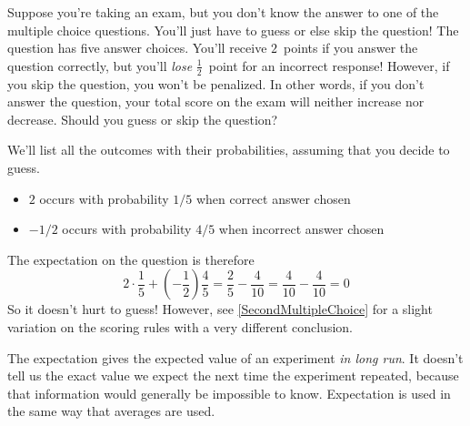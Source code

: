 \documentclass{ximera}
\begin{document}
\begin{example}
Suppose you're taking an exam, but you
don't know the answer to one of the
multiple choice questions. You'll just have to guess or
else skip the question!
The question has five answer choices. You'll receive
$2$~points if you answer the question correctly,
but you'll {\em lose} $\frac{1}{2}$~point for an incorrect response!
However, if you skip the question, you won't be penalized.
In other words, if you don't answer the question, your total
score on the exam will neither increase nor decrease.
Should you guess or skip the question?

We'll list all the outcomes with their probabilities,
assuming that you decide to guess.
\begin{itemize}
\item $2$ occurs with probability $1/5$ when correct answer chosen
\item $-1/2$ occurs with probability $4/5$ when incorrect answer chosen
\end{itemize}
The expectation on the question is therefore
\[2\cdot\frac{1}{5}+\left(-\frac{1}{2}\right)\frac{4}{5}
=\frac{2}{5}-\frac{4}{10}
=\frac{4}{10}-\frac{4}{10}
=0\]
So it doesn't hurt to guess!
However, see \autoref{SecondMultipleChoice} for a slight
variation on the scoring rules
with a very different conclusion.
\end{example}

\begin{remark}
The expectation gives
the expected value of an experiment {\em in long run}.
It doesn't tell us the exact value we expect
the next time the experiment repeated, because that
information would generally be impossible to know.
Expectation is used in the same way that averages are used.
\end{remark}
\end{document}
